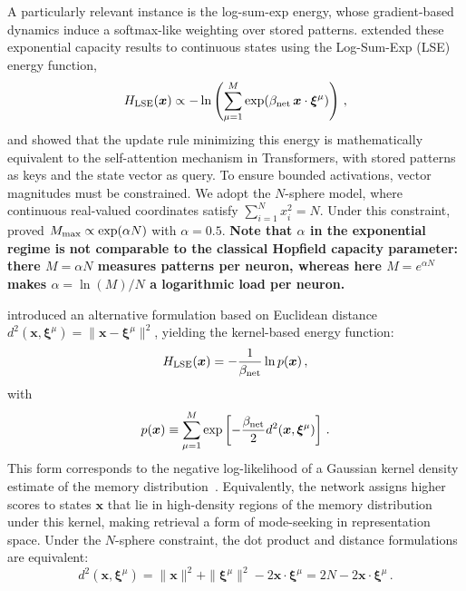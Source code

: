 \documentclass{article}
\theoremstyle{plain}
\theoremstyle{definition}
\theoremstyle{remark}
\begin{document}
A particularly relevant instance is the log-sum-exp energy, whose gradient-based dynamics induce a softmax-like weighting over stored patterns.
\citet{ramsauer2021hopfield} extended these exponential capacity results to continuous states using the Log-Sum-Exp (LSE) energy function,
\begin{equation}
    H_{\rm LSE}(\bm{x}) \propto -\ln \left( \sum_{\mu=1}^M \exp(\beta_{\rm net} \, \bm{x} \cdot \bm{\xi}^\mu) \right) \,,
    \label{eq:lse_energy}
\end{equation}
and showed that the update rule minimizing this energy is mathematically equivalent to the self-attention mechanism in Transformers, with stored patterns as keys and the state vector as query. To ensure bounded activations, vector magnitudes must be constrained. We adopt the $N$-sphere model, where continuous real-valued coordinates satisfy $\sum_{i=1}^{N} x_i^2 = N$. Under this constraint, \citet{ramsauer2021hopfield} proved $M_{\rm max} \propto \exp(\alpha N)$ with $\alpha = 0.5$. \textbf{Note that $\alpha$ in the exponential regime is not comparable to the classical Hopfield capacity parameter: there $M = \alpha N$ measures patterns per neuron, whereas here $M = e^{\alpha N}$ makes $\alpha = \ln(M)/N$ a logarithmic load per neuron.}

\citet{krotov2021large} introduced an alternative formulation based on Euclidean distance $d^2(\bm{x}, \bm{\xi}^\mu) = \|\bm{x}-\bm{\xi}^\mu\|^2$, yielding the kernel-based energy function:
\begin{equation}
    H_{\rm LSE}(\bm{x}) = -\frac{1}{\beta_{\rm net}} \ln p(\bm{x}) \,,
    \label{eq:H_lse}
\end{equation}
with 
\begin{equation}
    p(\bm{x}) \equiv \sum_{\mu=1}^M \exp\left[ - \frac{\beta_{\rm net}}{2} d^2(\bm{x}, \bm{\xi}^\mu) \right] \,.
    \label{eq:dens}
\end{equation}
This form corresponds to the negative log-likelihood of a Gaussian kernel density estimate of the memory distribution~\citep{hoover2025dense}. Equivalently, the network assigns higher scores to states $\bm{x}$ that lie in high-density regions of the memory distribution under this kernel, making retrieval a form of mode-seeking in representation space. Under the $N$-sphere constraint, the dot product and distance formulations are equivalent:
\begin{equation}
    d^2(\bm{x}, \bm{\xi}^\mu) = \|\bm{x}\|^2 + \|\bm{\xi}^\mu\|^2 - 2\bm{x} \cdot \bm{\xi}^\mu = 2N - 2\bm{x} \cdot \bm{\xi}^\mu \,.
    \label{eq:edist}
\end{equation}
\end{document}
